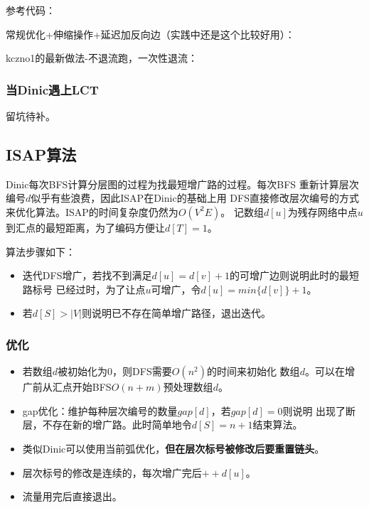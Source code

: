 参考代码：

常规优化+伸缩操作+延迟加反向边（实践中还是这个比较好用）：


kczno1的最新做法-不退流跑，一次性退流：


\subsubsection{当Dinic遇上LCT}

留坑待补。

\subsection{ISAP算法}

Dinic每次BFS计算分层图的过程为找最短增广路的过程。每次BFS
重新计算层次编号$d$似乎有些浪费，因此ISAP在Dinic的基础上用
DFS直接修改层次编号的方式来优化算法。ISAP的时间复杂度仍然为$O(V^2E)$。
记数组$d[u]$为残存网络中点$u$到汇点的最短距离，为了编码方便让$d[T]=1$。

算法步骤如下：
\begin{itemize}
	\item 迭代DFS增广，若找不到满足$d[u]=d[v]+1$的可增广边则说明此时的最短路标号
	已经过时，为了让点$u$可增广，令$d[u]=min\{d[v]\}+1$。
	\item 若$d[S]>|V|$则说明已不存在简单增广路径，退出迭代。
\end{itemize}

\subsubsection{优化}
\begin{itemize}
	\item 若数组$d$被初始化为0，则DFS需要$O(n^2)$的时间来初始化
	数组$d$。可以在增广前从汇点开始BFS$O(n+m)$预处理数组$d$。
	\item gap优化：维护每种层次编号的数量$gap[d]$，若$gap[d]=0$则说明
	出现了断层，不存在新的增广路。此时简单地令$d[S]=n+1$结束算法。
	\item 类似Dinic可以使用当前弧优化，{\bfseries 但在层次标号被修改后要重置链头}。
	\item 层次标号的修改是连续的，每次增广完后$++d[u]$。
	\item 流量用完后直接退出。
\end{itemize}

